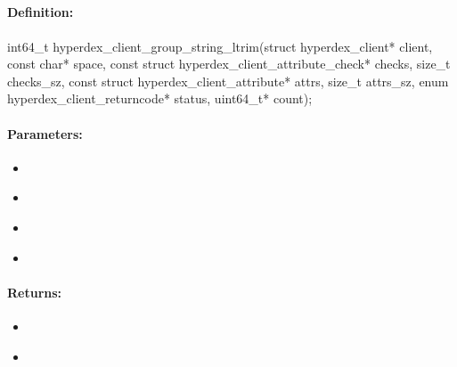 \pagebreak
\subsection{}
\label{api:c:group_string_ltrim}


\paragraph{Definition:}
\begin{ccode}
int64_t hyperdex_client_group_string_ltrim(struct hyperdex_client* client,
        const char* space,
        const struct hyperdex_client_attribute_check* checks, size_t checks_sz,
        const struct hyperdex_client_attribute* attrs, size_t attrs_sz,
        enum hyperdex_client_returncode* status,
        uint64_t* count);
\end{ccode}

\paragraph{Parameters:}
\begin{itemize}[noitemsep]
\item {}\\

\item {}\\

\item {}\\

\item {}\\

\end{itemize}

\paragraph{Returns:}
\begin{itemize}[noitemsep]
\item {}\\

\item {}\\

\end{itemize}

